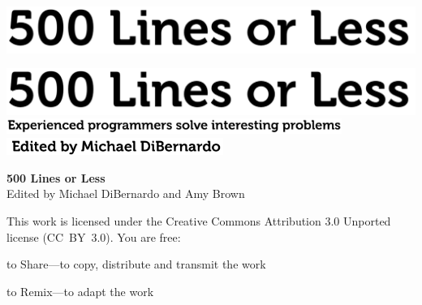 \newpage

\thispagestyle{empty}
\vspace*{8.5cm}
\hspace{-2.3cm}
\includegraphics[width=445pt]{frontmatter-images/title.pdf}

\newpage

\thispagestyle{empty}
\mbox{}    %

\newpage

\thispagestyle{empty}
\vspace*{8.5cm}
\hspace{-2.3cm}
\includegraphics[width=445pt]{frontmatter-images/title.pdf}
\\
\vspace{0.5cm}   %
\hspace{-1.8cm}   %
\includegraphics[width=310pt]{frontmatter-images/subtitle.pdf}
\vfill
\hfill
\includegraphics[width=200pt]{frontmatter-images/eds.pdf}

\newpage

\thispagestyle{empty}

\small
\noindent \textbf{500 Lines or Less} \\
Edited by Michael DiBernardo and Amy Brown

\vspace{0.15cm}

\noindent
This work is licensed under the Creative Commons Attribution 3.0
Unported license (CC~BY~3.0).  You are free:

\begin{aosaitemize}
  \item to Share---to copy, distribute and transmit the work
  \item to Remix---to adapt the work
\end{aosaitemize}

